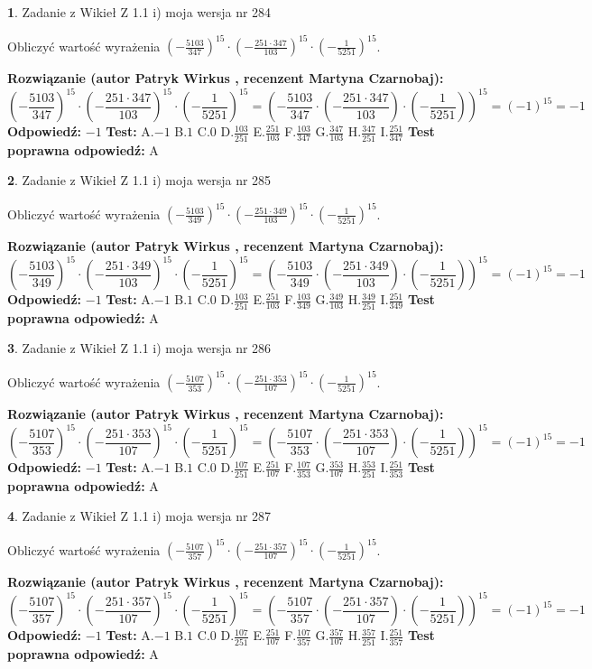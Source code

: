\documentclass[12pt, a4paper]{article}
\theoremstyle{definition} %
\newtheorem{zad}{}
\newcommand{\zadStart}[1]{\begin{zad}#1\newline}
\newcommand{\zadStop}{\end{zad}}
\newcommand{\rozwStart}[2]{\noindent \textbf{Rozwiązanie (autor #1 , recenzent #2): }\newline}
\newcommand{\rozwStop}{\newline}
\newcommand{\odpStart}{\noindent \textbf{Odpowiedź:}\newline}
\newcommand{\odpStop}{\newline}
\newcommand{\testStart}{\noindent \textbf{Test:}\newline}
\newcommand{\testStop}{\newline}
\newcommand{\kluczStart}{\noindent \textbf{Test poprawna odpowiedź:}\newline}
\newcommand{\kluczStop}{\newline}
\begin{document}
\zadStart{Zadanie z Wikieł Z 1.1 i) moja wersja nr 284}

Obliczyć wartość wyrażenia $(-\frac{5103}{347})^{15} \cdot (-\frac{251 \cdot 347}{103})^{15} \cdot (-\frac{1}{5251})^{15}$.
\zadStop
\rozwStart{Patryk Wirkus}{Martyna Czarnobaj}
$$(-\frac{5103}{347})^{15} \cdot (-\frac{251 \cdot 347}{103})^{15} \cdot (-\frac{1}{5251})^{15} = (-\frac{5103}{347} \cdot (-\frac{251 \cdot 347}{103}) \cdot (-\frac{1}{5251}))^{15} = (-1)^{15} = -1$$
\rozwStop
\odpStart
$-1$
\odpStop
\testStart
A.$-1$ B.$1$ C.$0$ D.$\frac{103}{251}$ E.$\frac{251}{103}$
F.$\frac{103}{347}$ G.$\frac{347}{103}$
H.$\frac{347}{251}$
I.$\frac{251}{347}$
\testStop
\kluczStart
A
\kluczStop



\zadStart{Zadanie z Wikieł Z 1.1 i) moja wersja nr 285}

Obliczyć wartość wyrażenia $(-\frac{5103}{349})^{15} \cdot (-\frac{251 \cdot 349}{103})^{15} \cdot (-\frac{1}{5251})^{15}$.
\zadStop
\rozwStart{Patryk Wirkus}{Martyna Czarnobaj}
$$(-\frac{5103}{349})^{15} \cdot (-\frac{251 \cdot 349}{103})^{15} \cdot (-\frac{1}{5251})^{15} = (-\frac{5103}{349} \cdot (-\frac{251 \cdot 349}{103}) \cdot (-\frac{1}{5251}))^{15} = (-1)^{15} = -1$$
\rozwStop
\odpStart
$-1$
\odpStop
\testStart
A.$-1$ B.$1$ C.$0$ D.$\frac{103}{251}$ E.$\frac{251}{103}$
F.$\frac{103}{349}$ G.$\frac{349}{103}$
H.$\frac{349}{251}$
I.$\frac{251}{349}$
\testStop
\kluczStart
A
\kluczStop



\zadStart{Zadanie z Wikieł Z 1.1 i) moja wersja nr 286}

Obliczyć wartość wyrażenia $(-\frac{5107}{353})^{15} \cdot (-\frac{251 \cdot 353}{107})^{15} \cdot (-\frac{1}{5251})^{15}$.
\zadStop
\rozwStart{Patryk Wirkus}{Martyna Czarnobaj}
$$(-\frac{5107}{353})^{15} \cdot (-\frac{251 \cdot 353}{107})^{15} \cdot (-\frac{1}{5251})^{15} = (-\frac{5107}{353} \cdot (-\frac{251 \cdot 353}{107}) \cdot (-\frac{1}{5251}))^{15} = (-1)^{15} = -1$$
\rozwStop
\odpStart
$-1$
\odpStop
\testStart
A.$-1$ B.$1$ C.$0$ D.$\frac{107}{251}$ E.$\frac{251}{107}$
F.$\frac{107}{353}$ G.$\frac{353}{107}$
H.$\frac{353}{251}$
I.$\frac{251}{353}$
\testStop
\kluczStart
A
\kluczStop



\zadStart{Zadanie z Wikieł Z 1.1 i) moja wersja nr 287}

Obliczyć wartość wyrażenia $(-\frac{5107}{357})^{15} \cdot (-\frac{251 \cdot 357}{107})^{15} \cdot (-\frac{1}{5251})^{15}$.
\zadStop
\rozwStart{Patryk Wirkus}{Martyna Czarnobaj}
$$(-\frac{5107}{357})^{15} \cdot (-\frac{251 \cdot 357}{107})^{15} \cdot (-\frac{1}{5251})^{15} = (-\frac{5107}{357} \cdot (-\frac{251 \cdot 357}{107}) \cdot (-\frac{1}{5251}))^{15} = (-1)^{15} = -1$$
\rozwStop
\odpStart
$-1$
\odpStop
\testStart
A.$-1$ B.$1$ C.$0$ D.$\frac{107}{251}$ E.$\frac{251}{107}$
F.$\frac{107}{357}$ G.$\frac{357}{107}$
H.$\frac{357}{251}$
I.$\frac{251}{357}$
\testStop
\kluczStart
A
\kluczStop
\end{document}
